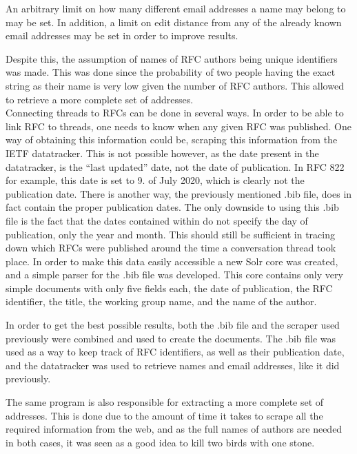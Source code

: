 \documentclass[a4paper,english]{report}
\begin{document}
An arbitrary limit on how many different email addresses a name may belong to may be set. In addition, a limit on edit distance from any of the already known email addresses may be set in order to improve results. 

Despite this, the assumption of names of RFC authors being unique identifiers was made. This was done since the probability of two people having the exact string as their name is very low given the number of RFC authors.
This allowed to retrieve a more complete set of addresses.\\ 



Connecting threads to RFCs can be done in several ways. In order to be able to link RFC to threads, one needs to know when any given RFC was published. One way of obtaining this information could be, scraping this information from the IETF datatracker. This is not possible however, as the date present in the datatracker, is the “last updated” date, not the date of publication. 
In RFC 822 \cite{RFC0822} for example, this date is set to 9. of July 2020, which is clearly not the publication date. There is another way, the previously mentioned .bib file, does in fact contain the proper publication dates. The only downside to using this .bib file is the fact that the dates contained within do not specify the day of publication, only the year and month. This should still be sufficient in tracing down which RFCs were published around the time a conversation thread took place. In order to make this data easily accessible a new Solr core was created, and a simple parser for the .bib file was developed. This core contains only very simple documents with only five fields each, the date of publication, the RFC identifier, the title, the working group name, and the name of the author.

In order to get the best possible results, both the .bib file and the scraper used previously were combined and used to create the documents. The .bib file was used as a way to keep track of RFC identifiers, as well as their publication date, and the datatracker was used to retrieve names and email addresses, like it did previously. 

The same program is also responsible for extracting a more complete set of addresses. This is done due to the amount of time it takes to scrape all the required information from the web, and as the full names of authors are needed in both cases, it was seen as a good idea to kill two birds with one stone.  
\end{document}
